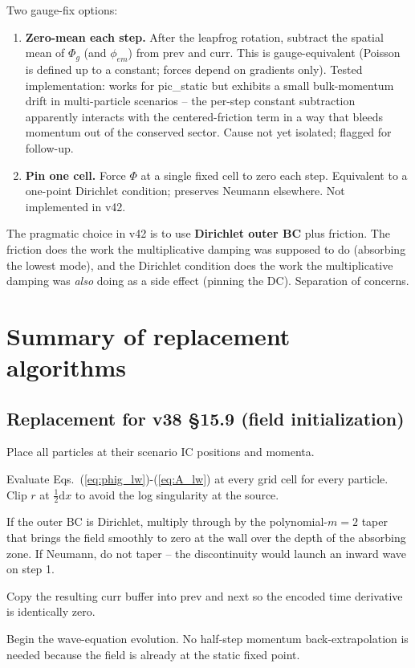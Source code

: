 \documentclass[11pt,a4paper]{article}
\newcommand{\Phig}{\Phi_g}
\newcommand{\dd}{\mathrm{d}}
\newcommand{\half}{\tfrac{1}{2}}
\begin{document}
Two gauge-fix options:
\begin{enumerate}[leftmargin=*,nosep]
\item \textbf{Zero-mean each step.}  After the leapfrog rotation,
  subtract the spatial mean of $\Phig$ (and $\phi_{em}$) from prev and
  curr.  This is gauge-equivalent (Poisson is defined up to a
  constant; forces depend on gradients only).  Tested implementation:
  works for pic\_static but exhibits a small bulk-momentum drift in
  multi-particle scenarios -- the per-step constant subtraction
  apparently interacts with the centered-friction term in a way
  that bleeds momentum out of the conserved sector.  Cause not yet
  isolated; flagged for follow-up.
\item \textbf{Pin one cell.}  Force $\Phi$ at a single fixed cell to
  zero each step.  Equivalent to a one-point Dirichlet condition;
  preserves Neumann elsewhere.  Not implemented in v42.
\end{enumerate}
The pragmatic choice in v42 is to use \textbf{Dirichlet outer BC}
plus friction.  The friction does the work the multiplicative
damping was supposed to do (absorbing the lowest mode), and the
Dirichlet condition does the work the multiplicative damping was
\emph{also} doing as a side effect (pinning the DC).  Separation of
concerns.

\section{Summary of replacement algorithms}

\subsection*{Replacement for v38 \S 15.9 (field initialization)}

\begin{algsteps}
  \item Place all particles at their scenario IC positions and momenta.
  \item Evaluate Eqs.~(\ref{eq:phig_lw})-(\ref{eq:A_lw}) at every grid
    cell for every particle.  Clip $r$ at $\half\dd x$ to avoid the
    log singularity at the source.
  \item If the outer BC is Dirichlet, multiply through by the
    polynomial-$m=2$ taper that brings the field smoothly to zero at
    the wall over the depth of the absorbing zone.  If Neumann, do
    not taper -- the discontinuity would launch an inward wave on
    step 1.
  \item Copy the resulting curr buffer into prev and next so the
    encoded time derivative is identically zero.
  \item Begin the wave-equation evolution.  No half-step momentum
    back-extrapolation is needed because the field is already at the
    static fixed point.
\end{algsteps}
\end{document}
